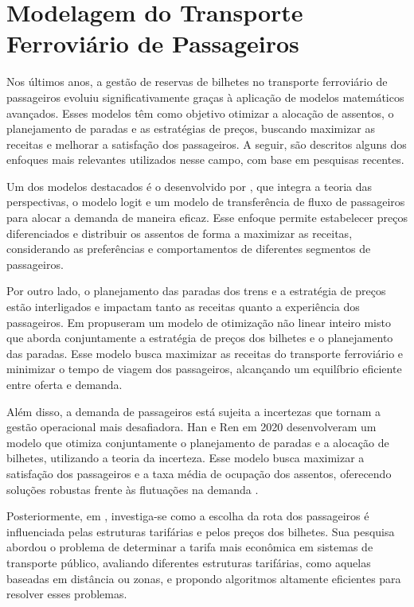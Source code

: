 \section{Modelagem do Transporte Ferroviário de Passageiros}
Nos últimos anos, a gestão de reservas de bilhetes no transporte ferroviário de passageiros evoluiu significativamente graças à aplicação de modelos matemáticos avançados. Esses modelos têm como objetivo otimizar a alocação de assentos, o planejamento de paradas e as estratégias de preços, buscando maximizar as receitas e melhorar a satisfação dos passageiros. A seguir, são descritos alguns dos enfoques mais relevantes utilizados nesse campo, com base em pesquisas recentes.

Um dos modelos destacados é o desenvolvido por \cite{zhou2023pricing}, que integra a teoria das perspectivas, o modelo logit e um modelo de transferência de fluxo de passageiros para alocar a demanda de maneira eficaz. Esse enfoque permite estabelecer preços diferenciados e distribuir os assentos de forma a maximizar as receitas, considerando as preferências e comportamentos de diferentes segmentos de passageiros.

Por outro lado, o planejamento das paradas dos trens e a estratégia de preços estão interligados e impactam tanto as receitas quanto a experiência dos passageiros. Em \cite{zhou2022nonlinear} propuseram um modelo de otimização não linear inteiro misto que aborda conjuntamente a estratégia de preços dos bilhetes e o planejamento das paradas. Esse modelo busca maximizar as receitas do transporte ferroviário e minimizar o tempo de viagem dos passageiros, alcançando um equilíbrio eficiente entre oferta e demanda.

Além disso, a demanda de passageiros está sujeita a incertezas que tornam a gestão operacional mais desafiadora. Han e Ren em 2020 desenvolveram um modelo que otimiza conjuntamente o planejamento de paradas e a alocação de bilhetes, utilizando a teoria da incerteza. Esse modelo busca maximizar a satisfação dos passageiros e a taxa média de ocupação dos assentos, oferecendo soluções robustas frente às flutuações na demanda \cite{han2020uncertainty}.

Posteriormente, em \cite{schoebel2021tariff}, investiga-se como a escolha da rota dos passageiros é influenciada pelas estruturas tarifárias e pelos preços dos bilhetes. Sua pesquisa abordou o problema de determinar a tarifa mais econômica em sistemas de transporte público, avaliando diferentes estruturas tarifárias, como aquelas baseadas em distância ou zonas, e propondo algoritmos altamente eficientes para resolver esses problemas.